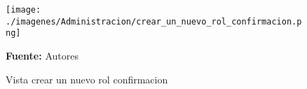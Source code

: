 \begin{figure}[!htb]
  \begin{center}
\texttt{[image: ./imagenes/Administracion/crear\_un\_nuevo\_rol\_confirmacion.png]}
    \caption{Vista crear un nuevo rol confirmacion}
    \label{fig:Vista_crear_un_nuevo_rol_confirmacion}
    \textbf{Fuente:}  Autores
  \end{center}
\end{figure}
